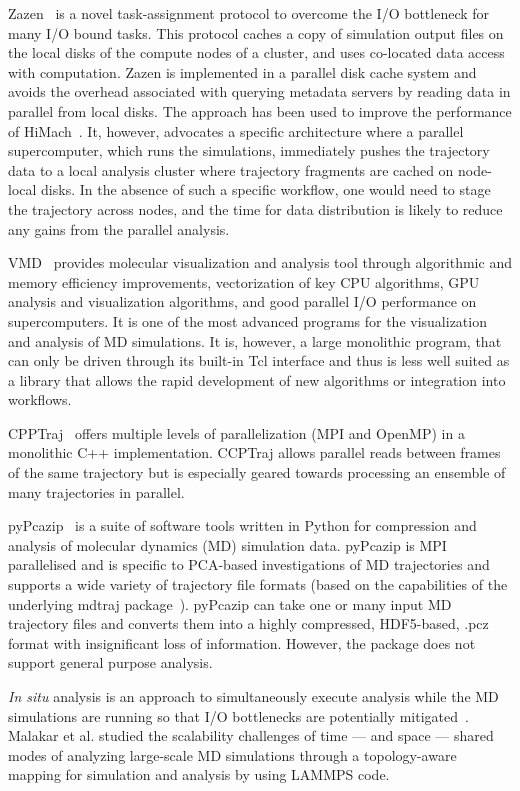 Zazen~\cite{Zazen} is a novel task-assignment protocol to overcome the I/O bottleneck for many I/O bound tasks. This protocol caches a copy of simulation output files on the local disks of the compute nodes of a cluster, and uses co-located data access with computation. 
Zazen is implemented in a parallel disk cache system and avoids the overhead associated with querying metadata servers by reading data in parallel from local disks.
The approach has been used to improve the performance of HiMach~\cite{himach-2008}.
It, however, advocates a specific architecture where a parallel supercomputer, which runs the simulations, immediately pushes the trajectory data to a local analysis cluster where trajectory fragments are cached on node-local disks.
In the absence of such a specific  workflow, one would need to stage the trajectory across nodes, and the time for data distribution is likely to reduce any gains from the parallel analysis.

VMD~\cite{Hum96, VMD2013} provides molecular visualization and analysis tool through algorithmic and memory efficiency improvements, vectorization of key CPU algorithms, GPU analysis and visualization algorithms, and good parallel I/O performance on supercomputers. It is one of the most advanced programs for the visualization and analysis of MD simulations. It is, however, a large monolithic program, that can only be driven through its built-in Tcl interface and thus is less well suited as a library that allows the rapid development of new algorithms or integration into workflows.

CPPTraj~\cite{cpptraj-2013} offers multiple levels of parallelization (MPI and OpenMP) in a monolithic C++ implementation.
CCPTraj allows parallel reads between frames of the same trajectory but is especially geared towards processing an ensemble of many trajectories in parallel.

pyPcazip~\cite{pyPcazip} is a suite of software tools written in Python for compression and analysis of molecular dynamics (MD) simulation data. 
pyPcazip is MPI parallelised and is specific to PCA-based investigations of MD trajectories and supports a wide variety of trajectory file formats (based on the capabilities of the underlying mdtraj package~\cite{mdtraj-2015}).
pyPcazip can take one or many input MD trajectory files and converts them into a highly compressed, HDF5-based, .pcz format with insignificant loss of information.
However, the package does not support general purpose analysis.

\textit{In situ} analysis is an approach to simultaneously execute analysis while the MD simulations are running so that I/O bottlenecks are potentially mitigated~\cite{Malakar-etal}.
Malakar et al. studied the scalability challenges of time --- and space --- shared modes of analyzing large-scale MD simulations through a topology-aware mapping for simulation and analysis by using LAMMPS code.

